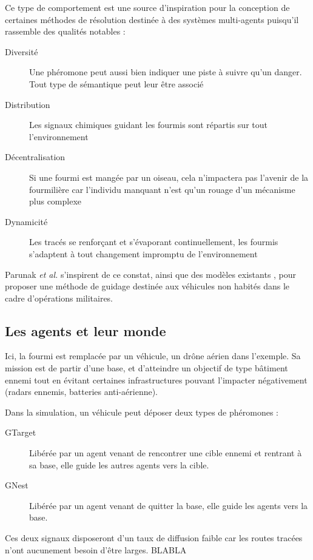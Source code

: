 \documentclass[12pt]{article}
\begin{document}
Ce type de comportement est une source d'inspiration pour la
conception de certaines méthodes de résolution destinée à des systèmes
multi-agents puisqu'il rassemble des qualités notables
\cite{parunak} :

\begin{description}
\item[Diversité]{Une phéromone peut aussi bien indiquer une piste à suivre qu'un danger. Tout type de sémantique peut leur être associé}
  \item[Distribution]{Les signaux chimiques guidant les fourmis sont répartis
sur tout l'environnement}
  \item[Décentralisation]{Si une fourmi est mangée par un oiseau, cela
  n'impactera pas l'avenir de la fourmilière car l'individu manquant
  n'est qu'un rouage d'un mécanisme plus complexe}
  \item[Dynamicité]{Les tracés se renforçant et s'évaporant continuellement, les fourmis
s'adaptent à tout changement impromptu de l'environnement}
\end{description}

Parunak \textit{et al.} s'inspirent de ce constat, ainsi que des
modèles existants \cite{dorigo}, pour proposer une méthode de guidage
destinée aux véhicules non habités dans le cadre
d'opérations militaires.

\subsection{Les agents et leur monde}

Ici, la fourmi est remplacée par un véhicule, un drône aérien dans l'exemple. Sa mission
est de partir d'une base, et d'atteindre un objectif de type bâtiment ennemi tout en évitant
certaines infrastructures pouvant l'impacter négativement (radars ennemis, batteries anti-aérienne).

Dans la simulation, un véhicule peut déposer deux types de phéromones :

\begin{description}
  \item[GTarget]{Libérée par un agent venant de rencontrer une cible ennemi et rentrant à sa base, elle guide les autres agents vers la cible.}
  \item[GNest]{Libérée par un agent venant de quitter la base, elle guide les agents vers la base.}
\end{description}

Ces deux signaux disposeront d'un taux de diffusion faible car les routes tracées n'ont aucunement besoin d'être larges. BLABLA
\end{document}
